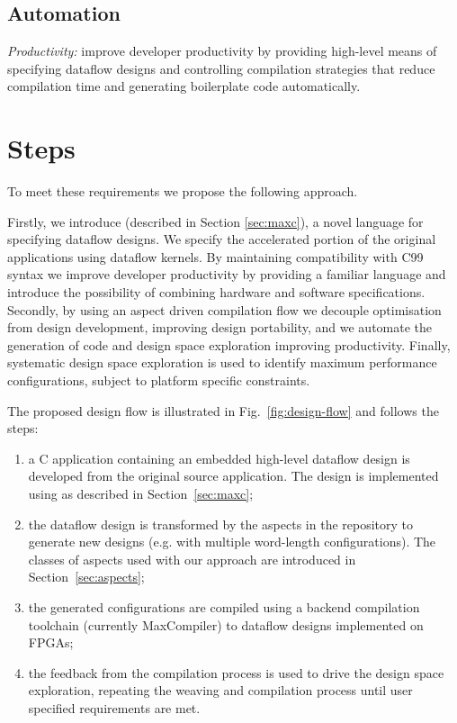 \subsection{Automation}
\emph{Productivity:} improve developer productivity by providing
high-level means of specifying dataflow designs and controlling
compilation strategies that reduce compilation time and generating
boilerplate code automatically.


\section{Steps}

To meet these requirements we propose the following approach.

Firstly, we introduce \FAST{} (described in Section \ref{sec:maxc}), a
novel language for specifying dataflow designs. We specify the
accelerated portion of the original applications using \FAST{}
dataflow kernels. By maintaining compatibility with C99 syntax we
improve developer productivity by providing a familiar language and
introduce the possibility of combining hardware and software
specifications. Secondly, by using an aspect driven compilation flow
we decouple optimisation from design development, improving design
portability, and we automate the generation of code and design space
exploration improving productivity. Finally, systematic design space
exploration is used to identify maximum performance configurations,
subject to platform specific constraints.

The proposed design flow is illustrated in Fig.~\ref{fig:design-flow}
and follows the steps:
\begin{enumerate}
\item a C application containing an embedded high-level dataflow
  design is developed from the original source application. The design
  is implemented using \FAST{} as described in Section~\ref{sec:maxc};
\item the dataflow design is transformed by the aspects in the
  repository to generate new designs (e.g. with multiple word-length
  configurations). The classes of aspects used with our approach are
  introduced in Section~\ref{sec:aspects};
\item the generated configurations are compiled using a backend
  compilation toolchain (currently MaxCompiler) to dataflow designs
  implemented on FPGAs;
\item the feedback from the compilation process is used to drive the
  design space exploration, repeating the weaving and compilation
  process until user specified requirements are met.
\end{enumerate}



